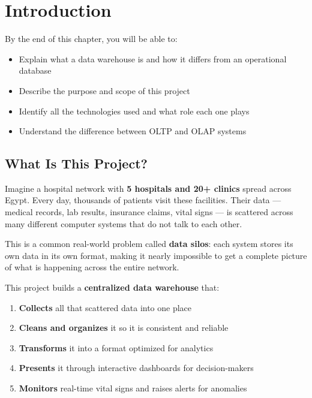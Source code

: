 \documentclass[12pt, a4paper, oneside]{report}
\begin{document}
\listoffigures
\newpage


\chapter{Introduction}
\label{ch:introduction}

\begin{objectivebox}
By the end of this chapter, you will be able to:
\begin{itemize}
    \item Explain what a data warehouse is and how it differs from an operational database
    \item Describe the purpose and scope of this project
    \item Identify all the technologies used and what role each one plays
    \item Understand the difference between OLTP and OLAP systems
\end{itemize}
\end{objectivebox}

\section{What Is This Project?}

Imagine a hospital network with \textbf{5 hospitals and 20+ clinics} spread across Egypt. Every day, thousands of patients visit these facilities. Their data --- medical records, lab results, insurance claims, vital signs --- is scattered across many different computer systems that do not talk to each other.

This is a common real-world problem called \textbf{data silos}: each system stores its own data in its own format, making it nearly impossible to get a complete picture of what is happening across the entire network.

This project builds a \textbf{centralized data warehouse} that:
\begin{enumerate}[label=\textcolor{primary}{\arabic*.}]
    \item \textbf{Collects} all that scattered data into one place
    \item \textbf{Cleans and organizes} it so it is consistent and reliable
    \item \textbf{Transforms} it into a format optimized for analytics
    \item \textbf{Presents} it through interactive dashboards for decision-makers
    \item \textbf{Monitors} real-time vital signs and raises alerts for anomalies
\end{enumerate}
\end{document}
